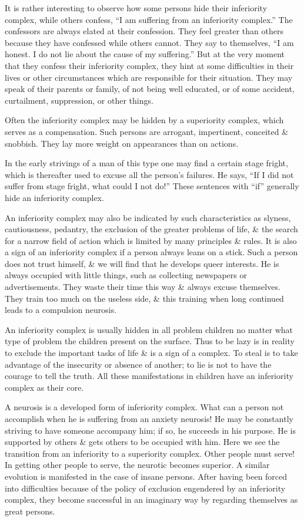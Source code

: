 \documentclass{article}
\begin{document}
It is rather interesting to observe how some persons hide their inferiority complex, while others confess, ``I am suffering from an inferiority complex.'' The confessors are always elated at their confession. They feel greater than others because they have confessed while others cannot. They say to themselves, ``I am honest. I do not lie about the cause of my suffering.'' But at the very moment that they confess their inferiority complex, they hint at some difficulties in their lives or other circumstances which are responsible for their situation. They may speak of their parents or family, of not being well educated, or of some accident, curtailment, suppression, or other things.

Often the inferiority complex may be hidden by a superiority complex, which serves as a compensation. Such persons are arrogant, impertinent, conceited \& snobbish. They lay more weight on appearances than on actions.

In the early strivings of a man of this type one may find a certain stage fright, which is thereafter used to excuse all the person's failures. He says, ``If I did not suffer from stage fright, what could I not do!'' These sentences with ``if'' generally hide an inferiority complex.

An inferiority complex may also be indicated by such characteristics as slyness, cautiousness, pedantry, the exclusion of the greater problems of life, \& the search for a narrow field of action which is limited by many principles \& rules. It is also a sign of an inferiority complex if a person always leans on a stick. Such a person does not trust himself, \& we will find that he develops queer interests. He is always occupied with little things, such as collecting newspapers or advertisements. They waste their time this way \& always excuse themselves. They train too much on the useless side, \& this training when long continued leads to a compulsion neurosis.

An inferiority complex is usually hidden in all problem children no matter what type of problem the children present on the surface. Thus to be lazy is in reality to exclude the important tasks of life \& is a sign of a complex. To steal is to take advantage of the insecurity or absence of another; to lie is not to have the courage to tell the truth. All these manifestations in children have an inferiority complex as their core.

A neurosis is a developed form of inferiority complex. What can a person not accomplish when he is suffering from an anxiety neurosis! He may be constantly striving to have someone accompany him; if so, he succeeds in his purpose. He is supported by others \& gets others to be occupied with him. Here we see the transition from an inferiority to a superiority complex. Other people must serve! In getting other people to serve, the neurotic becomes superior. A similar evolution is manifested in the case of insane persons. After having been forced into difficulties because of the policy of exclusion engendered by an inferiority complex, they become successful in an imaginary way by regarding themselves as great persons.
\end{document}
